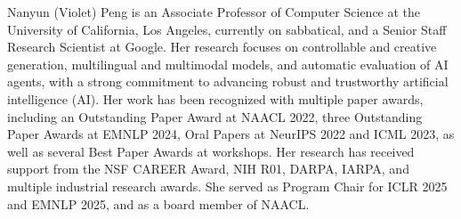 Nanyun (Violet) Peng is an Associate Professor of Computer Science at the University of California, Los Angeles, currently on sabbatical, and a Senior Staff Research Scientist at Google. Her research focuses on controllable and creative generation, multilingual and multimodal models, and automatic evaluation of AI agents, with a strong commitment to advancing robust and trustworthy artificial intelligence (AI). Her work has been recognized with multiple paper awards, including an Outstanding Paper Award at NAACL 2022, three Outstanding Paper Awards at EMNLP 2024, Oral Papers at NeurIPS 2022 and ICML 2023, as well as several Best Paper Awards at workshops. Her research has received support from the NSF CAREER Award, NIH R01, DARPA, IARPA, and multiple industrial research awards. She served as Program Chair for ICLR 2025 and EMNLP 2025, and as a board member of NAACL.
%
